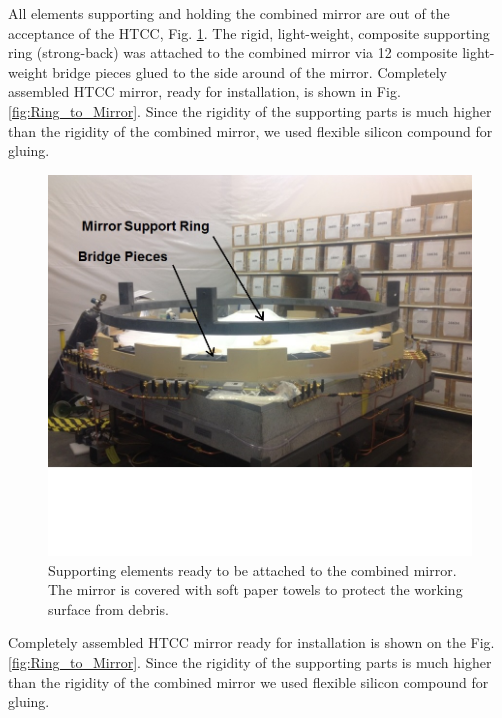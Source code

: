 All elements supporting and holding the combined mirror are out of the acceptance of the HTCC, Fig. \ref{fig:Support_Ring}. The rigid, light-weight, composite supporting ring (strong-back) was attached to the combined mirror via 12 composite light-weight bridge pieces glued to the side around of the mirror. Completely assembled HTCC mirror, ready for installation, is shown in Fig. \ref{fig:Ring_to_Mirror}. Since the rigidity of the supporting parts is much higher than the rigidity of the combined mirror, we used flexible silicon compound for gluing.
  
\begin{figure}[ht]
    \centering
    \includegraphics[width=1.0\linewidth,trim={0 5cm 0 0},clip]{images/Support_Ring.jpg}
    \caption{Supporting elements ready to be attached to the combined mirror. The mirror is covered with soft paper towels to protect the working surface from debris.}
    \label{fig:Support_Ring}
\end{figure}

Completely assembled HTCC mirror ready for installation is shown on the Fig.\ref{fig:Ring_to_Mirror}. Since the rigidity of the supporting parts is much higher than the rigidity of the combined mirror we used flexible silicon compound for gluing.

